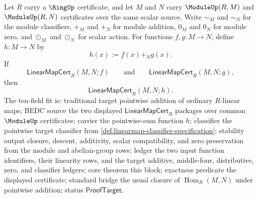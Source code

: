 \begin{theorem}
\label{thm:module-linearmap-pointwise-sum-certificate}
Let $R$ carry a $\RingUp$ certificate, and let $M$ and $N$ carry $\ModuleUp(R,M)$ and $\ModuleUp(R,N)$ certificates over the same scalar source. Write $\sim_M$ and $\sim_N$ for the module classifiers, $+_M$ and $+_N$ for module addition, $0_M$ and $0_N$ for module zero, and $\odot_M$ and $\odot_N$ for scalar action. For functions $f,g:M\to N$, define $h:M\to N$ by
$$
h(x):=f(x)+_N g(x).
$$
If
$$
\mathsf{LinearMapCert}_R(M,N;f)
\qquad\text{and}\qquad
\mathsf{LinearMapCert}_R(M,N;g),
$$
then
$$
\mathsf{LinearMapCert}_R(M,N;h).
$$
The ten-field fit is: traditional target pointwise addition of ordinary $R$-linear maps; BEDC source the two displayed $\mathsf{LinearMapCert}_R$ packages over common $\ModuleUp$ certificates; carrier the pointwise-sum function $h$; classifier the pointwise target classifier from \autoref{def:linearmap-classifier-specification}; stability output closure, descent, additivity, scalar compatibility, and zero preservation from the module and abelian-group rows; ledger the two input function identifiers, their linearity rows, and the target additive, middle-four, distributive, zero, and classifier ledgers; core theorem this block; exactness predicate the displayed certificate; standard bridge the usual closure of $\operatorname{Hom}_R(M,N)$ under pointwise addition; status $\mathsf{ProofTarget}$.
\end{theorem}
